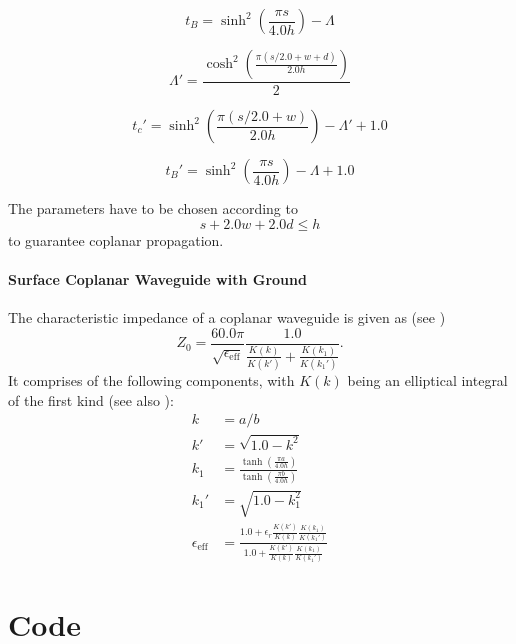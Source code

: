 \begin{equation}
	t_B = \sinh^2 \left( \frac{\pi s}{4.0 h} \right) - \Lambda
\end{equation}


\begin{equation}
	\Lambda' = \frac{\cosh^2 \left( \frac{\pi (s/2.0 + w + d)}{2.0 h} \right) }{2}
\end{equation}

\begin{equation}
	t_c' = \sinh^2 \left( \frac{\pi (s/2.0 + w)}{2.0 h} \right) - \Lambda' + 1.0
\end{equation}

\begin{equation}
	t_B' = \sinh^2 \left( \frac{\pi s}{4.0 h} \right) - \Lambda + 1.0
\end{equation}

The parameters have to be chosen according to 
\begin{equation}
	s + 2.0 w + 2.0 d \leq h
\end{equation}
to guarantee coplanar propagation. \cite{wadell}


\paragraph{Surface Coplanar Waveguide with Ground}  
The characteristic impedance of a coplanar waveguide is given as (see \cite{wadell}) 
\begin{equation}
	Z_0 = \frac{60.0 \pi}{\sqrt{\epsilon_\text{eff}}} \frac{1.0}{\frac{K(k)}{K(k')} + \frac{K(k_1)}{K(k_1')}}.
\end{equation}
It comprises of the following components, with $K(k)$ being an elliptical integral of the first kind (see also \cite[p.~430]{bronstein}):
\begin{align}
	k &= a/b\\
	k' &= \sqrt{1.0 - k^{2}}\\
	k_1 &= \frac{\tanh(\frac{\pi a}{4.0  h})}{\tanh(\frac{\pi  b}{4.0 h})}\\
	k_1' &= \sqrt{1.0 - k_1^{2}}\\
	\epsilon_\text{eff} &= \frac{1.0 + \epsilon_r \frac{K(k')}{K(k)} \frac{K(k_1)}{K(k_1')}}{1.0 + \frac{K(k')}{K(k)} \frac{K(k_1)}{K(k_1')}}
\end{align}

\section{Code}

